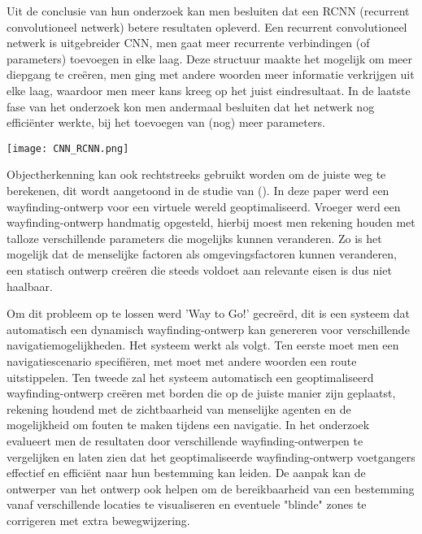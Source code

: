 Uit de conclusie van hun onderzoek kan men besluiten dat een RCNN (recurrent convolutioneel netwerk) betere resultaten opleverd. Een recurrent convolutioneel netwerk is uitgebreider CNN, men gaat meer recurrente verbindingen (of parameters) toevoegen in elke laag. Deze structuur maakte het mogelijk om meer diepgang te creëren, men ging met andere woorden meer informatie verkrijgen uit elke laag, waardoor men meer kans kreeg op het juist eindresultaat. In de laatste fase van het onderzoek kon men andermaal besluiten dat het netwerk nog efficiënter werkte, bij het toevoegen van (nog) meer parameters.

\begin{center}
	\texttt{[image: CNN\_RCNN.png]}
\end{center}

Objectherkenning kan ook rechtstreeks gebruikt worden om de juiste weg te berekenen, dit wordt aangetoond in de studie van \textcite{Haikun2017} (). In deze paper werd een wayfinding-ontwerp voor een virtuele wereld geoptimaliseerd. Vroeger werd een wayfinding-ontwerp handmatig opgesteld, hierbij moest men rekening houden met talloze verschillende parameters die mogelijks kunnen veranderen. Zo is het mogelijk dat de menselijke factoren als omgevingsfactoren  kunnen veranderen, een statisch ontwerp creëren die steeds voldoet aan relevante eisen is dus niet haalbaar.

Om dit probleem op te lossen werd 'Way to Go!' gecreërd, dit is een systeem dat automatisch een dynamisch wayfinding-ontwerp kan genereren voor verschillende navigatiemogelijkheden. Het systeem werkt als volgt. Ten eerste moet men een navigatiescenario specifiëren, met moet met andere woorden een route uitstippelen. Ten tweede zal het systeem automatisch een geoptimaliseerd wayfinding-ontwerp creëren met borden die op de juiste manier zijn geplaatst, rekening houdend met de zichtbaarheid van menselijke agenten en de mogelijkheid om fouten te maken tijdens een navigatie.  In het onderzoek evalueert men de resultaten door verschillende wayfinding-ontwerpen te vergelijken en laten zien dat het geoptimaliseerde wayfinding-ontwerp voetgangers effectief en efficiënt naar hun bestemming kan leiden. De aanpak kan de ontwerper van het ontwerp ook helpen om de bereikbaarheid van een bestemming vanaf verschillende locaties te visualiseren en eventuele "blinde" zones te corrigeren met extra bewegwijzering.

